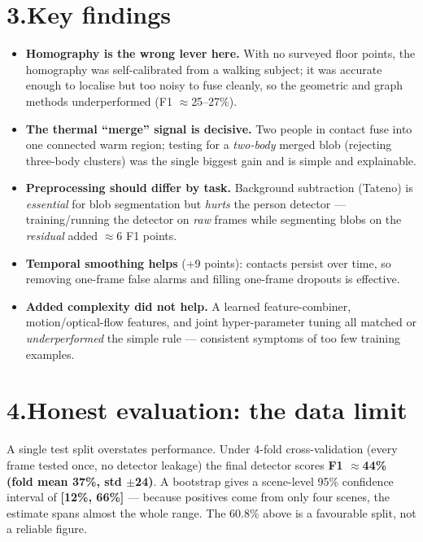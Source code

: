 \documentclass[11pt, a4paper]{article}
\begin{document}
\section*{3.\quad Key findings}
\begin{itemize}[leftmargin=1.4em, itemsep=2pt]
\item \textbf{Homography is the wrong lever here.} With no surveyed floor
      points, the homography was self-calibrated from a walking subject; it was
      accurate enough to localise but too noisy to fuse cleanly, so the
      geometric and graph methods underperformed (F1 $\approx$25--27\%).
\item \textbf{The thermal ``merge'' signal is decisive.} Two people in contact
      fuse into one connected warm region; testing for a \emph{two-body} merged
      blob (rejecting three-body clusters) was the single biggest gain and is
      simple and explainable.
\item \textbf{Preprocessing should differ by task.} Background subtraction
      (Tateno) is \emph{essential} for blob segmentation but \emph{hurts} the
      person detector --- training/running the detector on \emph{raw} frames
      while segmenting blobs on the \emph{residual} added $\approx$6 F1 points.
\item \textbf{Temporal smoothing helps} (+9 points): contacts persist over time,
      so removing one-frame false alarms and filling one-frame dropouts is
      effective.
\item \textbf{Added complexity did not help.} A learned feature-combiner,
      motion/optical-flow features, and joint hyper-parameter tuning all matched
      or \emph{underperformed} the simple rule --- consistent symptoms of too
      few training examples.
\end{itemize}

\section*{4.\quad Honest evaluation: the data limit}
A single test split overstates performance. Under 4-fold cross-validation
(every frame tested once, no detector leakage) the final detector scores
\textbf{F1 $\approx$44\% (fold mean 37\%, std $\pm$24)}. A bootstrap gives a
scene-level 95\% confidence interval of \textbf{[12\%, 66\%]} --- because
positives come from only four scenes, the estimate spans almost the whole range.
The 60.8\% above is a favourable split, not a reliable figure.
\end{document}
